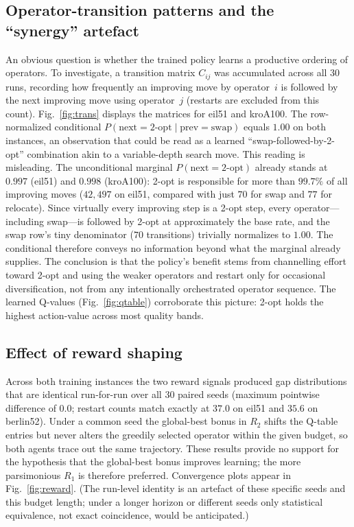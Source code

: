 \documentclass[10pt,twocolumn]{article}
\begin{document}
\subsection{Operator-transition patterns and the ``synergy'' artefact}
An obvious question is whether the trained policy learns a productive ordering
of operators. To investigate, a transition matrix $C_{ij}$ was accumulated
across all 30 runs, recording how frequently an improving move by operator~$i$
is followed by the next improving move using operator~$j$ (restarts are
excluded from this count). Fig.~\ref{fig:trans} displays the matrices for eil51
and kroA100. The row-normalized conditional
$P(\text{next}=\text{2-opt}\mid\text{prev}=\text{swap})$ equals $1.00$ on both
instances, an observation that could be read as a learned ``swap-followed-by-2-opt''
combination akin to a variable-depth search move. This reading is misleading.
The unconditional marginal $P(\text{next}=\text{2-opt})$ already stands at
$0.997$ (eil51) and $0.998$ (kroA100): 2-opt is responsible for more than
$99.7\%$ of all improving moves ($42{,}497$ on eil51, compared with just $70$
for swap and $77$ for relocate). Since virtually every improving step is a
2-opt step, every operator---including swap---is followed by 2-opt at
approximately the base rate, and the swap row's tiny denominator ($70$
transitions) trivially normalizes to $1.00$. The conditional therefore conveys
no information beyond what the marginal already supplies. The conclusion is
that the policy's benefit stems from channelling effort toward 2-opt and using
the weaker operators and restart only for occasional diversification, not from
any intentionally orchestrated operator sequence. The learned Q-values
(Fig.~\ref{fig:qtable}) corroborate this picture: 2-opt holds the highest
action-value across most quality bands.

\subsection{Effect of reward shaping}
Across both training instances the two reward signals produced gap
distributions that are identical run-for-run over all 30 paired seeds (maximum
pointwise difference of $0.0$; restart counts match exactly at $37.0$ on eil51
and $35.6$ on berlin52). Under a common seed the global-best bonus in $R_2$
shifts the Q-table entries but never alters the greedily selected operator
within the given budget, so both agents trace out the same trajectory. These
results provide no support for the hypothesis that the global-best bonus
improves learning; the more parsimonious $R_1$ is therefore preferred.
Convergence plots appear in Fig.~\ref{fig:reward}. (The run-level identity is
an artefact of these specific seeds and this budget length; under a longer
horizon or different seeds only statistical equivalence, not exact coincidence,
would be anticipated.)
\end{document}
